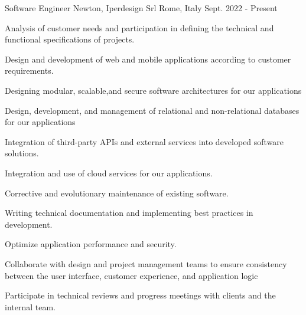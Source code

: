 

\begin{cventries}

  \cventry
  {Software Engineer} %
  {Newton, Iperdesign Srl} %
  {Rome, Italy} %
  {Sept. 2022 - Present} %
  {
    \begin{cvitems} %
      \item {Analysis of customer needs and participation in defining the technical and functional specifications of projects.}
      \item {Design and development of web and mobile applications according to customer requirements.}
      \item {Designing modular, scalable,and secure software architectures for our applications}
      \item {Design, development, and management of relational and non-relational databases for our applications}
      \item {Integration of third-party APIs and external services into developed software solutions.}
      \item {Integration and use of cloud services for our applications.}
      \item {Corrective and evolutionary maintenance of existing software.}
      \item {Writing technical documentation and implementing best practices in development.}
      \item {Optimize application performance and security.}
      \item {Collaborate with design and project management teams to ensure consistency between the user interface, customer experience, and application logic}
      \item {Participate in technical reviews and progress meetings with clients and the internal team.}
    \end{cvitems}
  }


\end{cventries}
